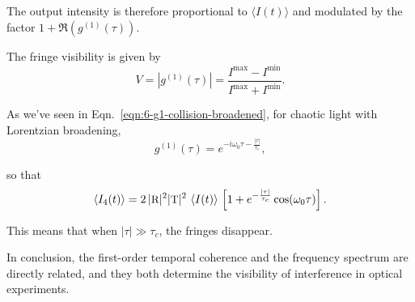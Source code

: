 The output intensity is therefore proportional to $\langle I(t)\rangle$ and modulated by the factor $1+\Re(g^{(1)}(\tau))$.

The fringe visibility is given by
\[
V=|g^{(1)}(\tau)|=\frac{I^{\max}-I^{\min}}{I^{\max}+I^{\min}}.
\]

As we've seen in Eqn.~\ref{eqn:6-g1-collision-broadened}, for chaotic light with Lorentzian broadening,
\[
g^{(1)}(\tau)=e^{-i\omega_0\tau-\frac{|\tau|}{\tau_c}},
\]

so that
\[
\langle I_4(t)\rangle=2\, |\textsc{\small{R}}|^2|\textsc{\small{T}}|^2\ \langle I(t)\rangle\,
\left[
    1+e^{-\frac{|\tau|}{\tau_c}}\cos(\omega_0\tau)
\right].
\]

This means that when $|\tau|\gg\tau_c$, the fringes disappear.

In conclusion, the first-order temporal coherence and the frequency spectrum are directly related, and they both determine the visibility of interference in optical experiments.

